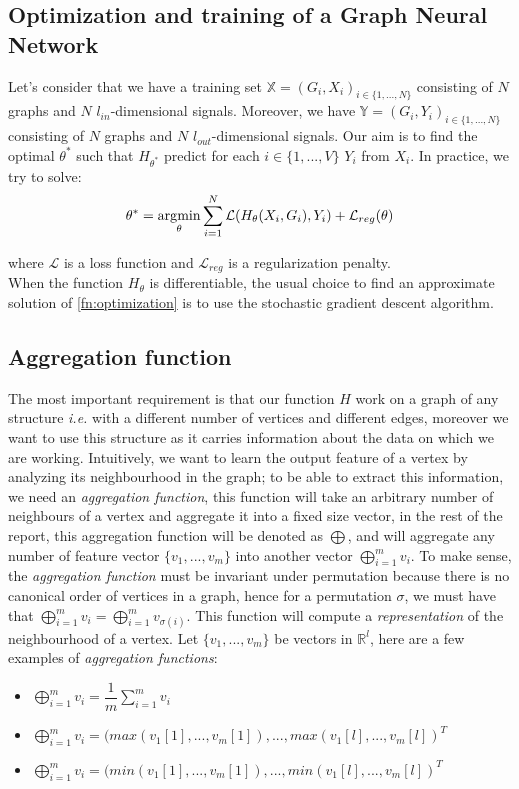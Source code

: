 \documentclass[12pt]{article}
\begin{document}
\subsection{Optimization and training of a Graph Neural Network}
Let's consider that we have a training set $\mathbb{X} = (G_i,X_i)_{i \in \{1,...,N\}}$ consisting of $N$ graphs and $N$ $l_{in}$-dimensional signals. Moreover, we have $\mathbb{Y} = (G_i,Y_i)_{i \in \{1,...,N\}}$ consisting of $N$ graphs and $N$ $l_{out}$-dimensional signals. Our aim is to find the optimal $\theta^*$ such that $H_{\theta^*}$ predict for each $i \in  \{1,...,V\}$ $Y_i$ from $X_i$. In practice, we try to solve:
\begin{align}\label{fn:optimization}
    \theta^* = \operatorname*{\arg\!\min}_{\theta} \sum_{i = 1}^N \mathcal{L}(H_{\theta}(X_i, G_i), Y_i) + \mathcal{L}_{reg}(\theta)
\end{align}

where $\mathcal{L}$ is a loss function and $\mathcal{L}_{reg}$ is a regularization  penalty.\\

When the function $H_{\theta}$ is differentiable, the usual choice to find an approximate solution of \ref{fn:optimization} is to use the stochastic gradient descent algorithm.

\subsection{Aggregation function}

 The most important requirement is that our function $H$ work on a graph of any structure {\it i.e.} with a different number of vertices and different edges, moreover we want to use this structure as it carries information about the data on which we are working. Intuitively, we want to learn the output feature of a vertex by analyzing its neighbourhood in the graph; to be able to extract this information, we need an {\it aggregation function}, this function will take an arbitrary number of neighbours of a vertex and aggregate it into a fixed size vector, in the rest of the report, this aggregation function will be denoted as $\bigoplus$, and will aggregate any number of feature vector $\{v_1,...,v_m\}$ into another vector $\bigoplus_{i=1}^m v_i$. To make sense, the {\it aggregation function} must be invariant under permutation because there is no canonical order of vertices in a graph, hence for a permutation $\sigma$, we must have that $\bigoplus_{i=1}^m v_i = \bigoplus_{i=1}^m v_{\sigma(i)}$. This function will compute a {\it representation} of the neighbourhood of a vertex. Let $\{v_1,...,v_m\}$ be vectors in $\mathbb{R}^l$, here are a few examples of {\it aggregation functions}:
\begin{itemize}
    \item $\bigoplus_{i=1}^m v_i = \dfrac{1}{m} \sum_{i=1}^m v_i$
    \item $\bigoplus_{i=1}^m v_i = (max(v_1[1],...,v_m[1]),..., max(v_1[l],...,v_m[l])^T$
    \item $\bigoplus_{i=1}^m v_i = (min(v_1[1],...,v_m[1]),..., min(v_1[l],...,v_m[l])^T$
\end{itemize}
\end{document}
